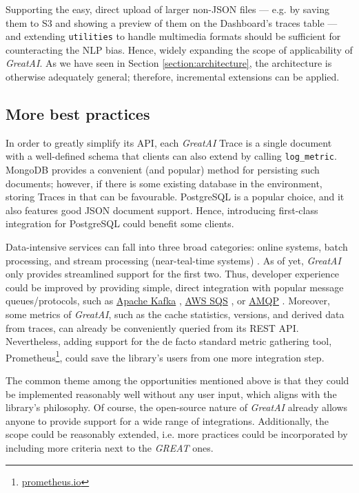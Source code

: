 Supporting the easy, direct upload of larger non-JSON files --- e.g. by saving them to S3 and showing a preview of them on the Dashboard's traces table --- and extending \texttt{utilities} to handle multimedia formats should be sufficient for counteracting the NLP bias. Hence, widely expanding the scope of applicability of \textit{GreatAI}. As we have seen in Section \ref{section:architecture}, the architecture is otherwise adequately general; therefore, incremental extensions can be applied.

\subsection{More best practices}

In order to greatly simplify its API, each \textit{GreatAI} Trace is a single document with a well-defined schema that clients can also extend by calling \texttt{log\_metric}. MongoDB provides a convenient (and popular) method for persisting such documents; however, if there is some existing database in the environment, storing Traces in that can be favourable. PostgreSQL \cite{momjian2001postgresql} is a popular choice, and it also features good JSON document support. Hence, introducing first-class integration for PostgreSQL could benefit some clients.

Data-intensive services can fall into three broad categories: online systems, batch processing, and stream processing (near-teal-time systems) \cite{kleppmann2017designing}. As of yet, \textit{GreatAI} only provides streamlined support for the first two. Thus, developer experience could be improved by providing simple, direct integration with popular message queues/protocols, such as \href{https://kafka.apache.org/}{Apache Kafka} \cite{kreps2011kafka}, \href{https://aws.amazon.com/sqs/}{AWS SQS} \cite{garfinkel2007evaluation}, or \href{https://www.amqp.org/}{AMQP} \cite{vinoski2006advanced}. Moreover, some metrics of \textit{GreatAI}, such as the cache statistics, versions, and derived data from traces, can already be conveniently queried from its REST API. Nevertheless, adding support for the de facto standard metric gathering tool, Prometheus\footnote{\href{https://prometheus.io/}{prometheus.io}}, could save the library's users from one more integration step.

The common theme among the opportunities mentioned above is that they could be implemented reasonably well without any user input, which aligns with the library's philosophy. Of course, the open-source nature of \textit{GreatAI} already allows anyone to provide support for a wide range of integrations. Additionally, the scope could be reasonably extended, i.e. more practices could be incorporated by including more criteria next to the \textit{GREAT} ones.
